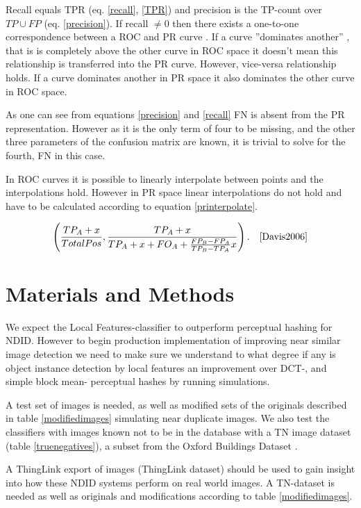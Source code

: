 \documentclass[english,12pt,a4paper,pdftex,elec,utf8]{aaltothesis}
\begin{document}
Recall equals TPR (eq. \ref{recall}, \ref{TPR}) and precision is the TP-count over $TP \cup FP$ (eq. \ref{precision}). If recall $\neq 0$ then there exists a one-to-one correspondence between a ROC and PR curve \cite{Davis2006}. If a curve ''dominates another'' \cite{Provost1997}, that is is completely above the other curve in ROC space it doesn't mean this relationship is transferred into the PR curve. However, vice-versa relationship holds. If a curve dominates another in PR space it also dominates the other curve in ROC space. \cite{Davis2006}

As one can see from equations \ref{precision} and \ref{recall} FN is absent from the PR representation. However as it is the only term of four to be missing, and the other three parameters of the confusion matrix are known, it is trivial to solve for the fourth, FN in this case. \cite{Davis2006}

In ROC curves it is possible to linearly interpolate between points and the interpolations hold. However in PR space linear interpolations do not hold and have to be calculated according to equation \ref{printerpolate}. \cite{Davis2006}

\begin{equation}\label{printerpolate}
\left(\frac{TP_A+x}{Total Pos}, \frac{TP_A+x}{TP_A+x+FO_A+ \frac{FP_B-FP_A}{TP_B-TP_A}x} \right). \quad \cite{Davis2006}
\end{equation}

\clearpage

\section{Materials and Methods} \label{mame}
We expect the Local Features-classifier to outperform perceptual hashing for NDID. However to begin production implementation of improving near similar image detection we need to make sure we understand to what degree if any is object instance detection by local features an improvement over DCT-, and simple block mean- perceptual hashes by running simulations.

A test set of images is needed, as well as modified sets of the originals described in table \ref{modifiedimages} simulating near duplicate images. We also test the classifiers with images known not to be in the database with a TN image dataset (table \ref{truenegatives}), a subset from the Oxford Buildings Dataset \cite{PhilbinJamesArandjelovicReljaZisserman2012}.

A ThingLink export of images (ThingLink dataset) should be used to gain insight into how these NDID systems perform on real world images. A TN-dataset is needed as well as originals and modifications according to table \ref{modifiedimages}.
\end{document}
